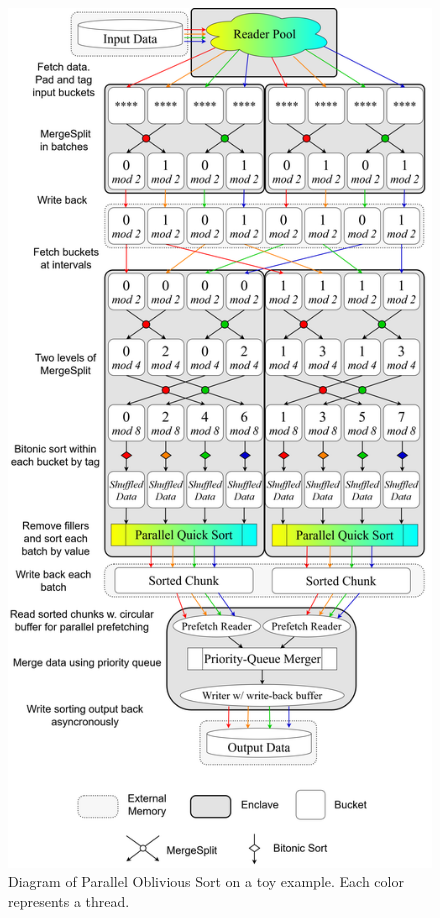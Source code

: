 \documentclass[final,hyperref={pdfpagelabels=false}]{beamer}
\begin{document}
\begin{frame}
\begin{columns}[t]
  \begin{column}{.30\linewidth}
    \begin{figure}
      \includegraphics[width=\linewidth]{assets/parosort.png}
      \caption{Diagram of Parallel Oblivious Sort on a toy example. Each color represents a thread.}
    \end{figure}
  \end{column}
  \end{columns}
\end{frame}
\end{document}
